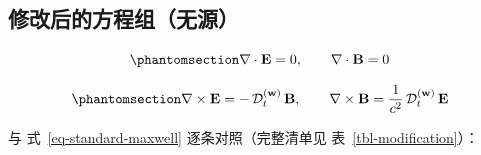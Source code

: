 \documentclass[
  chinese,
  a4paper,
  UTF8,
  12pt,
  oneside,
  openany]{ctexbook}
\theoremstyle{plain}
\theoremstyle{plain}
\theoremstyle{plain}
\theoremstyle{definition}
\theoremstyle{plain}
\theoremstyle{plain}
\theoremstyle{remark}
\begin{document}
\subsection{修改后的方程组（无源）}\label{ux4feeux6539ux540eux7684ux65b9ux7a0bux7ec4ux65e0ux6e90}

\begin{equation}\protect\phantomsection\label{eq-mod-div}{
\nabla\cdot\mathbf{E} = 0,
\qquad
\nabla\cdot\mathbf{B} = 0
}\end{equation}

\begin{equation}\protect\phantomsection\label{eq-mod-curl}{
\nabla\times\mathbf{E} = -\,\mathcal{D}_{t}^{(\mathbf{w})}\,\mathbf{B},
\qquad
\nabla\times\mathbf{B} = \frac{1}{c^{2}}\,\mathcal{D}_{t}^{(\mathbf{w})}\,\mathbf{E}
}\end{equation}

与 式~\ref{eq-standard-maxwell} 逐条对照（完整清单见
表~\ref{tbl-modification}）：
\end{document}

